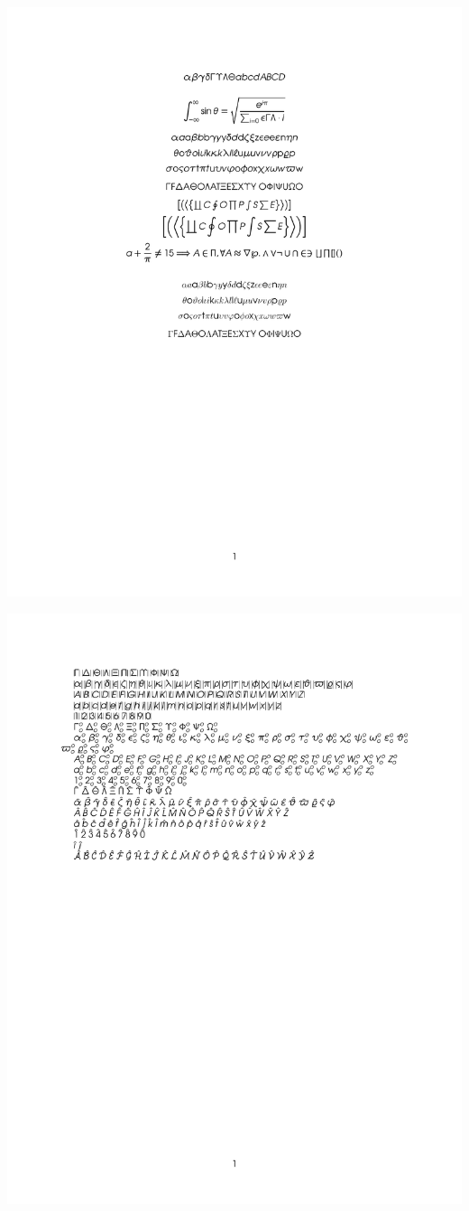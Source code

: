 \documentclass[twocolumn]{article}
\begin{document}
 \noindent\includegraphics*{../results/avantg-font}\par
{} \noindent\includegraphics*{../results/avantg-pos}\par
\end{document}
